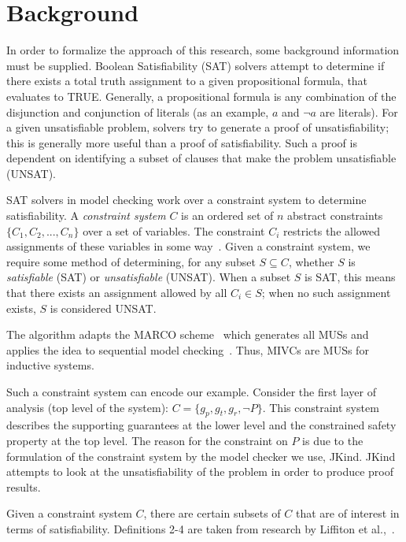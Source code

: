 \section{Background}
\label{sec:background}
In order to formalize the approach of this research, some background information must be supplied. Boolean Satisfiability (SAT) solvers attempt to determine if there exists a total truth assignment to a given propositional formula, that evaluates to TRUE. Generally, a propositional formula is any combination of the disjunction and conjunction of literals (as an example, $a$ and $\neg a$ are literals). For a given unsatisfiable problem, solvers try to generate a proof of unsatisfiability; this is generally more useful than a proof of satisfiability. Such a proof is dependent on identifying a subset of clauses that make the problem unsatisfiable (UNSAT). 

SAT solvers in model checking work over a constraint system to determine satisfiability. A \textit{constraint system} $C$ is an ordered set of $n$ abstract constraints $\{C_1, C_2, ..., C_n\}$ over a set of variables. The constraint $C_i$ restricts the allowed assignments of these variables in some way~\cite{liffiton2016fast}. Given a constraint system, we require some method of determining, for any subset $S \subseteq C$, whether $S$ is \textit{satisfiable} (SAT) or \textit{unsatisfiable} (UNSAT). When a subset $S$ is SAT, this means that there exists an assignment allowed by all $C_i \in S$; when no such assignment exists, $S$ is considered UNSAT. 

The \aivcalg algorithm adapts the MARCO scheme~\cite{liffiton2016fast} which generates all MUSs and applies the idea to sequential model checking~\cite{Ghassabani2017EfficientGO}. Thus, MIVCs are MUSs for inductive systems. 

Such a constraint system can encode our example. Consider the first layer of analysis (top level of the system): $C = \{g_p, g_t, g_r, \neg P\}$. This constraint system describes the supporting guarantees at the lower level and the constrained safety property at the top level. The reason for the constraint on $P$ is due to the formulation of the constraint system by the model checker we use, JKind. JKind attempts to look at the unsatisfiability of the problem in order to produce proof results. 

Given a constraint system $C$, there are certain subsets of $C$ that are of interest in terms of satisfiability. Definitions 2-4 are taken from research by Liffiton et al.,~\cite{liffiton2016fast}. 

